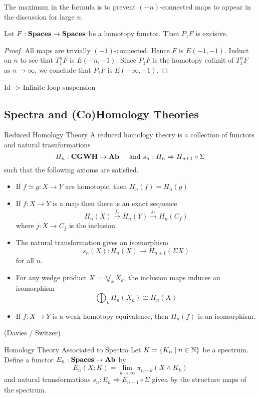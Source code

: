 \documentclass[a4paper]{article}
\begin{document}
The maximum in the formula is to prevent $(-n)$-connected maps to appear in the discussion for large $n$. 

\begin{thm}{}{} Let $F:\bold{Spaces}\to\bold{Spaces}$ be a homotopy functor. Then $P_1F$ is excisive. \tcbline
\begin{proof}
All maps are trivially $(-1)$-connected. Hence $F$ is $E(-1,-1)$. Induct on $n$ to see that $T_1^nF$ is $E(-n,-1)$. Since $P_1F$ is the homotopy colimit of $T_1^nF$ as $n\to\infty$, we conclude that $P_1F$ is $E(-\infty,-1)$. 
\end{proof}
\end{thm}

\begin{eg}{}{} Id -> Infinite loop suspension
\end{eg}

\subsection{Spectra and (Co)Homology Theories}
\begin{defn}{Reduced Homology Theory}{} A reduced homology theory is a collection of functors and natural trasnformations $$H_n:\bold{CGWH}\to\bold{Ab}\;\;\;\;\text{ and }s_n:H_n\Rightarrow H_{n+1}\circ\Sigma$$ such that the following axioms are satisfied. 
\begin{itemize}
\item If $f\simeq g:X\to Y$ are homotopic, then $H_n(f)=H_n(g)$
\item If $f:X\to Y$ is a map then there is an exact sequence $$H_n(X)\overset{f_\ast}{\rightarrow}H_n(Y)\overset{j_\ast}{\rightarrow}H_n(C_f)$$ where $j:X\to C_f$ is the inclusion. 
\item The natural transformation gives an isomorphism $$s_n(X):H_n(X)\to H_{n+1}(\Sigma X)$$ for all $n$. 
\item For any wedge product $X=\bigvee_k X_k$, the inclusion maps induces an isomorphism $$\bigoplus_k H_n(X_k)\cong H_n(X)$$
\item If $f:X\to Y$ is a weak homotopy equivalence, then $H_n(f)$ is an isomorphism. 
\end{itemize}
\end{defn} (Davies / Switzer)

\begin{defn}{Homology Theory Associated to Spectra}{} Let $K=\{K_n\;|\;n\in\mathbb{N}\}$ be a spectrum. Define a functor $E_n:\bold{Spaces}\to\bold{Ab}$ by $$E_n(X;K)=\lim_{k\to\infty}\pi_{n+k}(X\wedge K_k)$$ and natural transformations $s_n:E_n\Rightarrow E_{n+1}\circ\Sigma$ given by the structure maps of the spectrum. 
\end{defn}
\end{document}
